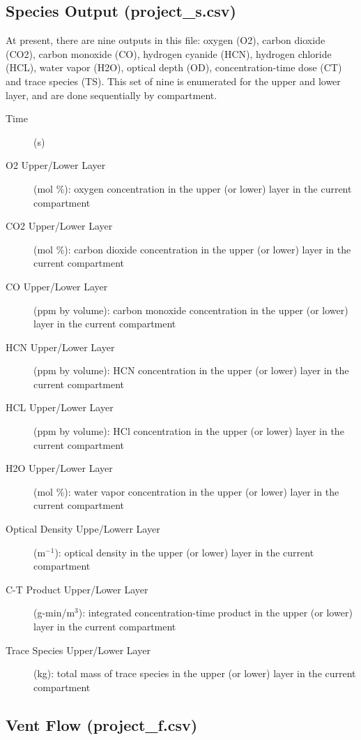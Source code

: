\subsection{Species Output (project\_s.csv)}

At present, there are nine outputs in this file: oxygen (O2), carbon dioxide (CO2), carbon monoxide (CO),  hydrogen cyanide (HCN), hydrogen chloride (HCL), water vapor (H2O), optical depth (OD), concentration-time dose (CT) and trace species (TS). This set of nine is enumerated for the upper and lower layer, and are done sequentially by compartment.
\begin{description}
\item[Time] (s)
\item[O2 Upper/Lower Layer] (mol \%): oxygen concentration in the upper (or lower) layer in the current compartment
\item[CO2 Upper/Lower Layer] (mol \%):  carbon dioxide concentration in the upper (or lower) layer in the current compartment
\item[CO Upper/Lower Layer] (ppm by volume):  carbon monoxide concentration in the upper (or lower) layer in the current compartment
\item[HCN Upper/Lower Layer] (ppm by volume):  HCN concentration in the upper (or lower) layer in the current compartment
\item[HCL Upper/Lower Layer] (ppm by volume):  HCl concentration in the upper (or lower) layer in the current compartment
\item[H2O Upper/Lower Layer] (mol \%):  water vapor concentration in the upper (or lower) layer in the current compartment
\item[Optical Density Uppe/Lowerr Layer] (m$^{-1}$):  optical density in the upper (or lower) layer in the current compartment
\item[C-T Product Upper/Lower Layer] (g-min/m$^3$):  integrated concentration-time product in the upper (or lower) layer in the current compartment
\item[Trace Species Upper/Lower Layer] (kg):  total mass of trace species in the upper (or lower) layer in the current compartment
\end{description}

\subsection{Vent Flow (project\_f.csv)}

